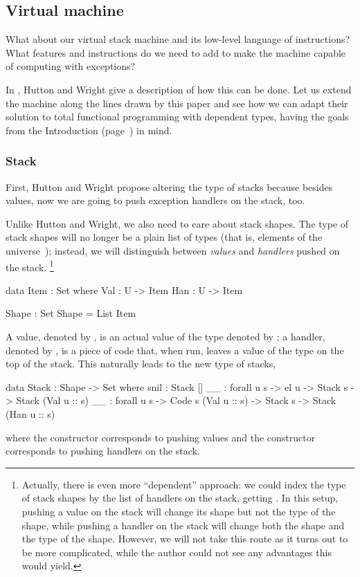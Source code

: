 \subsection{Virtual machine}

What about our virtual stack machine and its low-level language of
instructions? What features and instructions do we need to add to make the
machine capable of computing with exceptions?

In \cite{gmh:exceptions}, Hutton and Wright give a description of how this can
be done. Let us extend the machine along the lines drawn by this paper and see
how we can adapt their solution to total functional programming with dependent
types, having the goals from the Introduction (page~\pageref{objectives}) in
mind.

\subsubsection{Stack}

First, Hutton and Wright propose altering the type of stacks because besides
values, now we are going to push exception handlers on the stack, too.

Unlike Hutton and Wright, we also need to care about stack shapes.
The type of stack shapes will no longer be a plain
list of types (that is, elements of the universe~); instead, we  will
distinguish between \emph{values} and \emph{handlers} pushed on the stack.
\footnote{Actually, there is even more ``dependent'' approach: we could
index the type of stack shapes by the list of handlers on the stack, getting
. In this setup, pushing a value on the stack
will change its shape but not the type of the shape, while pushing a handler
on the stack will change both the shape and the type of the shape. However, we
will not take this route as it turns out to be more complicated, while the author
could not see any advantages this would yield.}

\begin{code}
  data Item : Set where
    Val : U -> Item
    Han : U -> Item

  Shape : Set
  Shape = List Item
\end{code}
A value, denoted by , is an actual value of the type
denoted by ; a handler, denoted by , is a piece of code
that, when run, leaves a value of the type  on the top of the stack.
This naturally leads to the new type of stacks,
\label{sec:gmh-ham-stack}\begin{code}
  data Stack : Shape -> Set where
    snil : Stack []
    _\scons\_ : forall {u s} -> el u -> Stack s -> Stack (Val u :: s)
    _\sconsh\_ : forall {u s} -> Code s (Val u :: s) -> Stack s -> Stack (Han u :: s)
\end{code}
where the constructor \ident{\scons\!\!} corresponds to pushing values and the
constructor \ident{\sconsh\!\!} corresponds to pushing handlers on the stack.

